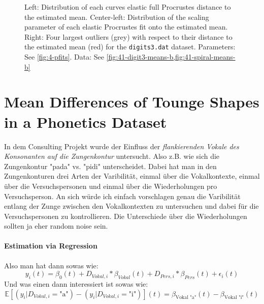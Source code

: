 \begin{figure}
  \centering
  \begin{subfigure}{0.24\textwidth}
  \end{subfigure}
  \begin{subfigure}{0.24\textwidth}
  \end{subfigure}
  \begin{subfigure}{0.48\textwidth}
    \centering
  \end{subfigure}
  \caption{Left: Distribution of each curves elastic full Procrustes distance to the estimated mean.
  Center-left: Distribution of the scaling parameter of each elastic Procrustes fit onto the estimated mean.
  Right: Four largest outliers (grey) with respect to their distance to the estimated mean (red) for the \texttt{digits3.dat} dataset.
  Parameters: See \cref{fig:4-pfits}. 
  Data: See \cref{fig:41-digit3-means-b,fig:41-spiral-means-b}}
  \label{fig:4-outliers}
\end{figure}



\section{Mean Differences of Tounge Shapes in a Phonetics Dataset}
\label{sec:4-tounges}
In dem Consulting Projekt wurde der Einfluss der \emph{flankierenden Vokale des Konsonanten auf die Zungenkontur} untersucht.
Also z.B. wie sich die Zungenkontur "pada" vs. "pidi" unterscheidet. Dabei hat man in den Zungenkonturen drei Arten der Varibilität, einmal über die Vokalkontexte, einmal über die Versuchspersonen und einmal über die Wiederholungen pro Versuchsperson.
An sich würde ich einfach vorschlagen genau die Varibilität entlang der Zunge zwischen den Vokalkontexten zu untersuchen und dabei für die Versuchspersonen zu kontrollieren.
Die Unterschiede über die Wiederholungen sollten ja eher random noise sein.

\paragraph{Estimation via Regression}
Also man hat dann sowas wie:
$$ y_i(t) = \beta_0(t) + D_{Vokal,i} * \beta_{Vokal}(t) + D_{Pers, i} * \beta_{Pers}(t) + \epsilon_i(t) $$
Und was einen dann interessiert ist sowas wie:
$$ \mathbb{E}\left[ (y_i | D_{Vokal, i} = \text{"a"})  - (y_i | D_{Vokal, i} = \text{"i"}) \right](t) = \beta_{\text{Vokal "a"}}(t) - \beta_{\text{Vokal "i"}}(t) $$

